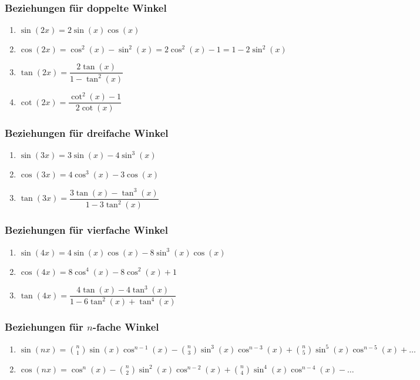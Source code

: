 \subsubsection{Beziehungen für doppelte Winkel}
\begin{enumerate}[$(a)$]
\item $\sin\left(2x\right)=2\sin\left(x\right)\cos\left(x\right)$
\item $\cos\left(2x\right)=\cos^2\left(x\right)-\sin^2\left(x\right)=2\cos^2\left(x\right)-1=1-2\sin^2\left(x\right)$
\item $\tan\left(2x\right)=\dfrac{2\tan\left(x\right)}{1-\tan^2\left(x\right)}$
\item $\cot\left(2x\right)=\dfrac{\cot^2\left(x\right)-1}{2\cot\left(x\right)}$
\end{enumerate}
\subsubsection{Beziehungen für dreifache Winkel}
\begin{enumerate}[$(a)$]
\item $\sin\left(3x\right)=3\sin\left(x\right)-4\sin^3\left(x\right)$
\item $\cos\left(3x\right)=4\cos^3\left(x\right)-3\cos\left(x\right)$
\item $\tan\left(3x\right)=\dfrac{3\tan\left(x\right)-\tan^3\left(x\right)}{1-3\tan^2\left(x\right)}$
\end{enumerate}
\subsubsection{Beziehungen für vierfache Winkel}
\begin{enumerate}[$(a)$]
\item $\sin\left(4x\right)=4\sin\left(x\right)\cos\left(x\right)-8\sin^3\left(x\right)\cos\left(x\right)$
\item $\cos\left(4x\right)=8\cos^4\left(x\right)-8\cos^2\left(x\right)+1$
\item $\tan\left(4x\right)=\dfrac{4\tan\left(x\right)-4\tan^3\left(x\right)}{1-6\tan^2\left(x\right)+\tan^4\left(x\right)}$ 
\end{enumerate}
\subsubsection{Beziehungen für $n$-fache Winkel}
\begin{enumerate}[$(a)$]
\item $\sin\left(nx\right)=\displaystyle \binom{n}{1}\sin\left(x\right)\cos^{n-1}\left(x\right)-\displaystyle \binom{n}{3}\sin^3\left(x\right)\cos^{n-3}\left(x\right)+\displaystyle \binom{n}{5}\sin^5\left(x\right)\cos^{n-5}\left(x\right)+\dotso$
\item $\cos\left(nx\right)=\cos^n\left(x\right)-\displaystyle \binom{n}{2}\sin^2\left(x\right)\cos^{n-2}\left(x\right)+\displaystyle \binom{n}{4}\sin^4\left(x\right)\cos^{n-4}\left(x\right)-\dotso$
\end{enumerate}
